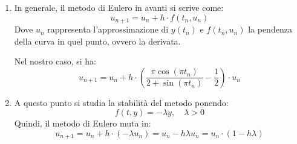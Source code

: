 \begin{enumerate}
\begin{enumerate}
        \item In generale, il metodo di Eulero in avanti si scrive come:
        \begin{equation*}
            u_{n+1} = u_{n} + h \cdot f(t_{n}, u_{n})
        \end{equation*}
        Dove $u_{n}$ rappresenta l'approssimazione di $y(t_{n})$ e $f(t_{n}, u_{n})$ \eaccent la pendenza della curva in quel punto, ovvero la derivata.

        Nel nostro caso, si ha:
        \begin{equation*}
            u_{n+1} = u_{n} + h \cdot \left(
                \dfrac{\pi \cos\left(\pi t_{n}\right)}{2 + \sin\left(\pi t_{n}\right)} - \dfrac{1}{2}
            \right) \cdot u_{n}
        \end{equation*}

        \item A questo punto si studia la stabilità del metodo ponendo:
        \begin{equation*}
            f(t, y) = -\lambda y, \quad \lambda > 0
        \end{equation*}
        Quindi, il metodo di Eulero muta in:
        \begin{equation*}
            u_{n+1} = u_{n} + h \cdot \left(-\lambda u_{n}\right) = u_{n} - h\lambda u_{n} = u_{n} \cdot \left(1 - h\lambda\right)
        \end{equation*}


\end{enumerate}
\end{enumerate}
